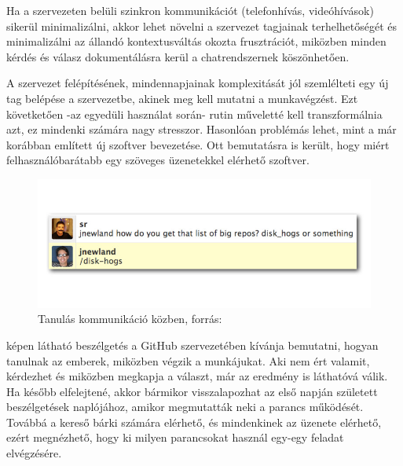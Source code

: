 Ha a szervezeten belüli szinkron kommunikációt (telefonhívás, videóhívások) sikerül minimalizálni, akkor lehet növelni a szervezet tagjainak terhelhetőségét és minimalizálni az állandó kontextusváltás okozta frusztrációt, miközben minden kérdés és válasz dokumentálásra kerül a chatrendszernek köszönhetően.

A szervezet felépítésének, mindennapjainak komplexitását jól szemlélteti egy új tag belépése a szervezetbe, akinek meg kell mutatni a munkavégzést. Ezt követketően -az egyedüli használat során- rutin műveletté kell transzformálnia azt, ez mindenki számára nagy stresszor. Hasonlóan problémás lehet, mint a már korábban említett új szoftver bevezetése. Ott bemutatásra is került, hogy miért felhasználóbarátabb egy szöveges üzenetekkel elérhető szoftver.

\begin{figure}[H]
  \centering
    \includegraphics[scale=.6]{assets/github_disk_how_is_it.png}%
    \caption[DUMMY]%
    {Tanulás kommunikáció közben, forrás: \cite[p.~65]{what_is_chatops_slideshow}}%
    \label{fig:learn_by_doing}
\end{figure}

 képen látható beszélgetés a GitHub szervezetében kívánja bemutatni, hogyan tanulnak az emberek, miközben végzik a munkájukat. Aki nem ért valamit, kérdezhet és miközben megkapja a választ, már az eredmény is láthatóvá válik. Ha később elfelejtené, akkor bármikor visszalapozhat az első napján született beszélgetések naplójához, amikor megmutatták neki a parancs működését. Továbbá a kereső bárki számára elérhető, és mindenkinek az üzenete elérhető, ezért megnézhető, hogy ki milyen parancsokat használ egy-egy feladat elvégzésére.


